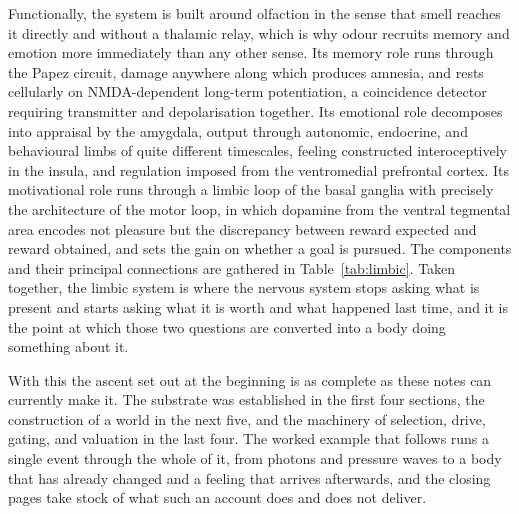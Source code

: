 \documentclass[11pt]{article}
\begin{document}
Functionally, the system is built around olfaction in the sense that smell reaches it directly and without a thalamic relay, which is why odour recruits memory and emotion more immediately than any other sense. Its memory role runs through the Papez circuit, damage anywhere along which produces amnesia, and rests cellularly on NMDA-dependent long-term potentiation, a coincidence detector requiring transmitter and depolarisation together. Its emotional role decomposes into appraisal by the amygdala, output through autonomic, endocrine, and behavioural limbs of quite different timescales, feeling constructed interoceptively in the insula, and regulation imposed from the ventromedial prefrontal cortex. Its motivational role runs through a limbic loop of the basal ganglia with precisely the architecture of the motor loop, in which dopamine from the ventral tegmental area encodes not pleasure but the discrepancy between reward expected and reward obtained, and sets the gain on whether a goal is pursued. The components and their principal connections are gathered in Table~\ref{tab:limbic}. Taken together, the limbic system is where the nervous system stops asking what is present and starts asking what it is worth and what happened last time, and it is the point at which those two questions are converted into a body doing something about it.

With this the ascent set out at the beginning is as complete as these notes can currently make it. The substrate was established in the first four sections, the construction of a world in the next five, and the machinery of selection, drive, gating, and valuation in the last four. The worked example that follows runs a single event through the whole of it, from photons and pressure waves to a body that has already changed and a feeling that arrives afterwards, and the closing pages take stock of what such an account does and does not deliver.
\end{document}
